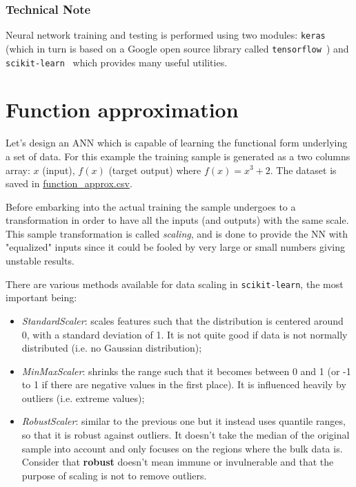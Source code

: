 \begin{attention}
\subsubsection{Technical Note}
\label{technical-note}

Neural network training and testing is performed using two modules: \texttt{keras}~\cite{bib:keras} (which in turn is based on a Google open source library called \texttt{tensorflow}~\cite{bib:tensorflow}) and \texttt{scikit-learn}~\cite{bib:scikit} which provides many useful utilities.
\end{attention}

\section{Function approximation}
\label{function-approximation}

Let's design an ANN which is capable of learning the functional form underlying a set of data. For this example the training sample is generated as a two columns array: $x$ (input), $f(x)$ (target output) where $f(x) = x^3 +2$. The dataset is saved in \href{https://github.com/matteosan1/finance_course/raw/develop/libro/input_files/function_approx.csv}{function\_approx.csv}. 

Before embarking into the actual training the sample undergoes to a transformation in order to have all the inputs (and outputs) with the same scale. This sample transformation is called \emph{scaling}, and is done to provide the NN with "equalized" inputs since it could be fooled by very large or small numbers giving unstable results.

There are various methods available for data scaling in \texttt{scikit-learn}, the most important being:
\begin{itemize}
\tightlist
\item \emph{StandardScaler}: scales features such that the distribution is centered around 0, with a standard deviation of 1. It is not quite good if data is not normally distributed (i.e. no Gaussian distribution);
\item \emph{MinMaxScaler}: shrinks the range such that it becomes between 0 and 1 (or -1 to 1 if there are negative values in the first place). It is influenced heavily by outliers (i.e. extreme values);
\item \emph{RobustScaler}: similar to the previous one but it instead uses quantile ranges, so that it is robust against outliers. It doesn't take the median of the original sample into account and only focuses on the regions where the bulk data is. Consider that \textbf{robust} doesn't mean immune or invulnerable and that the purpose of scaling is not to remove outliers.
\end{itemize}

